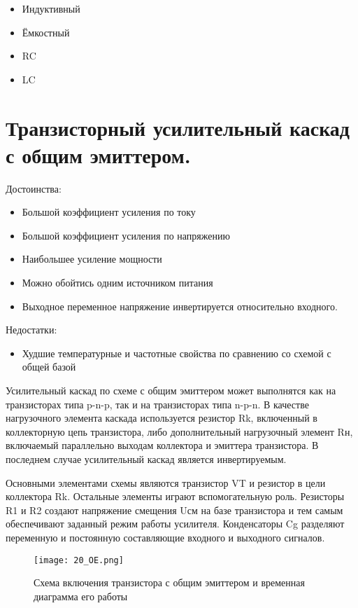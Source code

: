 \begin{itemize}
\item Индуктивный
\item Ёмкостный
\item RC
\item LC
\end{itemize}


\section{Транзисторный усилительный каскад с общим эмиттером.}

Достоинства:

\begin{itemize}
\item Большой коэффициент усиления по току
\item Большой коэффициент усиления по напряжению
\item Наибольшее усиление мощности
\item Можно обойтись одним источником питания
\item Выходное переменное напряжение инвертируется относительно входного.
\end{itemize}

Недостатки:

\begin{itemize}
\item Худшие температурные и частотные свойства по сравнению со схемой с общей базой
\end{itemize}

Усилительный каскад по схеме с общим эмиттером может выполнятся как на транзисторах типа p-n-p, так и на транзисторах типа n-p-n. В качестве нагрузочного элемента каскада используется резистор Rk, включенный в коллекторную цепь транзистора, либо дополнительный нагрузочный элемент Rн, включаемый параллельно выходам коллектора и эмиттера транзистора. В последнем случае усилительный каскад является инвертируемым.

Основными элементами схемы являются транзистор VT и резистор в цели коллектора Rk. Остальные элементы играют вспомогательную роль. Резисторы R1 и R2 создают напряжение смещения Uсм на базе транзистора и тем самым обеспечивают заданный режим работы усилителя. Конденсаторы Cg разделяют переменную и постоянную составляющие входного и выходного сигналов.

\begin{figure}[H]
\centering
\texttt{[image: 20\_OE.png]}
\caption{Схема включения транзистора с общим эмиттером и временная диаграмма его работы}
\label{fig:20_OE}
\end{figure}

